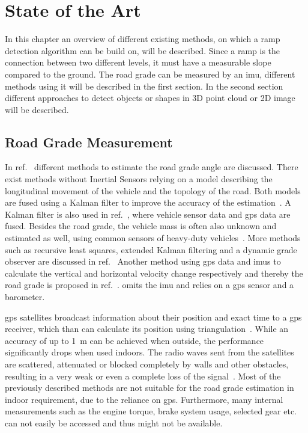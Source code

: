 \chapter{State of the Art}
\label{ch:StateOfTheArt}
In this chapter an overview of different existing methods, on which a ramp detection algorithm can be build on, will be described.
Since a ramp is the connection between two different levels, it must have a measurable slope compared to the ground.
The road grade can be measured by an \gls{imu}, different methods using it will be described in the first section.
In the second section different approaches to detect objects or shapes in 3D point cloud or 2D image will be described.

\section{Road Grade Measurement}
In ref.~\cite{Jauch2018} different methods to estimate the road grade angle are discussed.
There exist methods without Inertial Sensors relying on a model describing the longitudinal movement of the vehicle and the topology of the road.
Both models are fused using a Kalman filter to improve the accuracy of the estimation~\cite{Sahlholm2007}.
A Kalman filter is also used in ref.~\cite{Sahlholm2010}, where vehicle sensor data and \gls{gps} data are fused.
Besides the road grade, the vehicle mass is often also unknown and estimated as well, using common sensors of heavy-duty vehicles~\cite{Sahlholm2010, Maleej2014}.
More methods such as recursive least squares, extended Kalman filtering and a dynamic grade observer are discussed in ref.~\cite{Kidambi2014}
Another method using \gls{gps} data and \glspl{imu} to calculate the vertical and horizontal velocity change respectively and thereby the road grade is proposed in ref.~\cite{Ryu2004}.
\cite{YazdaniBoroujeni2014} omits the \gls{imu} and relies on a \gls{gps} sensor and a barometer.

\gls{gps} satellites broadcast information about their position and exact time to a \gls{gps} receiver, which than can calculate its position using triangulation~\cite{Mainetti2014}.
While an accuracy of up to \SI{1}{\metre} can be achieved when outside, the performance significantly drops when used indoors.
The radio waves sent from the satellites are scattered, attenuated or blocked completely by walls and other obstacles, resulting in a very weak or even a complete loss of the signal~\cite{Ozdenizci2015}.
Most of the previously described methods are not suitable for the road grade estimation in indoor requirement, due to the reliance on \gls{gps}.
Furthermore, many internal measurements such as the engine torque, brake system usage, selected gear etc. can not easily be accessed and thus might not be available.

